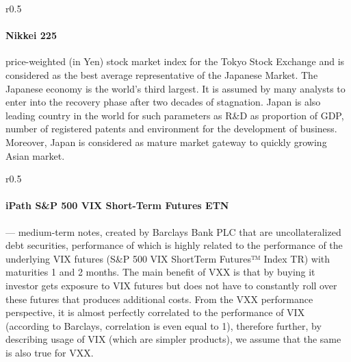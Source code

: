 \documentclass{scrreprt}
\begin{document}
\begin{wrapfigure}{r}{0.5\textwidth}
  \centering
\end{wrapfigure}
%
\paragraph{Nikkei 225} price-weighted (in Yen) stock market index for the Tokyo Stock Exchange and is considered as the best average representative of the Japanese Market.
The Japanese economy is the world’s third largest.
It is assumed by many analysts to enter into the recovery phase after two decades of stagnation.
Japan is also leading country in the world for such parameters as R\&D as proportion of GDP, number of registered patents and environment for the development of business.
Moreover, Japan is considered as mature market gateway to quickly growing Asian market.


\begin{wrapfigure}{r}{0.5\textwidth}
  \centering
\end{wrapfigure}
%
\paragraph{iPath S\&P 500 VIX Short-Term Futures ETN} --- medium-term notes, created by Barclays Bank PLC that are uncollateralized debt securities, performance of which is highly related to the performance of the underlying VIX futures (S\&P 500 VIX ShortTerm Futures™ Index TR) with maturities 1 and 2 months.
The main benefit of VXX is that by buying it investor gets exposure to VIX futures but does not have to constantly roll over these futures that produces additional costs.
From the VXX performance perspective, it is almost perfectly correlated to the performance of VIX (according to Barclays, correlation is even equal to 1), therefore further, by describing usage of VIX (which are simpler products), we assume that the same is also true for VXX.
\end{document}
